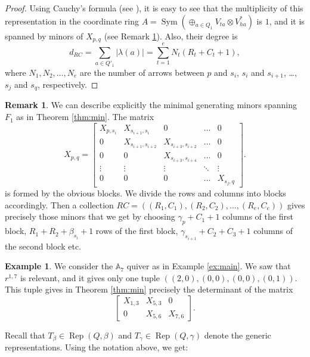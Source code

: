 \documentclass[twoside]{article}
\newcommand{\ds}{\displaystyle\sum}
\newcommand{\Rep}{\operatorname{Rep}}
\newcommand{\Sym}{\operatorname{Sym}}
\newcommand{\A}{\mathbb{A}}
\theoremstyle{definition}
\newtheorem{remark}[theorem]{Remark}
\newtheorem{example}[theorem]{Example}
\begin{document}
\begin{proof}
Using Cauchy's formula (see \cite{jerzy}), it is easy to see that the multiplicity of this representation in the coordinate ring $A=\Sym (\oplus_{a\in Q_1} V_{ta}\otimes V^*_{ha})$ is $1$, and it is spanned by minors of $X_{p,q}$ (see Remark \ref{rem:minors}). Also, their degree is 
\[d_{RC}=\ds_{a \in Q'_1} |\lambda(a)|=\ds_{t=1}^{e} N_t(R_t +C_t+1),\]
where $N_1,N_2,\dots, N_e$ are the number of arrows between  $p$ and $s_i$, $s_i$ and $s_{i+1}$, \dots, $s_j$ and $s_{q}$, respectively.
\end{proof}

\begin{remark}\label{rem:minors}
We can describe explicitly the minimal generating minors spanning $F_1$ as in Theorem \ref{thm:min}.  The matrix 
\[X_{p,q}=
\begin{bmatrix}
X_{p,s_i} & X_{s_{i+1},s_i} & 0 & \dots & 0 \\
 0 & X_{s_{i+1},s_{i+2}} & X_{s_{i+3},s_{i+2}} & \dots & 0 \\
 0 & 0 & X_{s_{i+3},s_{i+4}} & \dots & 0 \\
 \vdots & \vdots & \vdots & \ddots &\vdots\\
 0 & 0 & 0 & \dots & X_{s_j,q} 
\end{bmatrix}.
\]
is formed by the obvious blocks. We divide the rows and columns into blocks accordingly. Then a collection $RC=((R_1,C_1),(R_2,C_2),\dots,(R_e,C_e))$ gives precisely those minors that we get by choosing $\gamma_p+C_1+1$ columns of the first block, $R_1+R_2+\beta_{s_i}+1$ rows of the first block, $\gamma_{s_{i+1}}+C_2+C_3+1$ columns of the second block etc.
\end{remark}

\begin{example}
We consider the $\A_7$ quiver as in Example \ref{ex:main}. We saw that $r^{1,7}$ is relevant, and it gives only one tuple $((2,0),(0,0),(0,0),(0,1))$. This tuple gives in Theorem \ref{thm:min} precisely the determinant of the matrix
\[\begin{bmatrix}
X_{1,3} & X_{5,3} & 0 \\
 0 & X_{5,6} & X_{7,6}
\end{bmatrix}.\]
\end{example}

Recall that $T_\beta\in\Rep(Q,\beta)$ and $T_\gamma\in\Rep(Q,\gamma)$ denote the generic representations. Using the notation above, we get:
\end{document}
